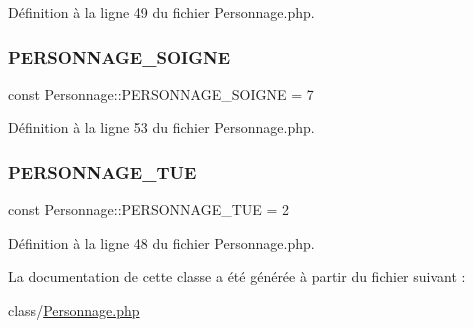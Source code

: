 Définition à la ligne 49 du fichier Personnage.\+php.

\mbox{\label{class_personnage_a8af7b48a38eda95264d46bd5b742a360}} 
\subsubsection{\texorpdfstring{P\+E\+R\+S\+O\+N\+N\+A\+G\+E\+\_\+\+S\+O\+I\+G\+NE}{PERSONNAGE\_SOIGNE}}
{\footnotesize\ttfamily const Personnage\+::\+P\+E\+R\+S\+O\+N\+N\+A\+G\+E\+\_\+\+S\+O\+I\+G\+NE = 7}



Définition à la ligne 53 du fichier Personnage.\+php.

\mbox{\label{class_personnage_ae654e11146b60710874ae7ddd8e0f9af}} 
\subsubsection{\texorpdfstring{P\+E\+R\+S\+O\+N\+N\+A\+G\+E\+\_\+\+T\+UE}{PERSONNAGE\_TUE}}
{\footnotesize\ttfamily const Personnage\+::\+P\+E\+R\+S\+O\+N\+N\+A\+G\+E\+\_\+\+T\+UE = 2}



Définition à la ligne 48 du fichier Personnage.\+php.



La documentation de cette classe a été générée à partir du fichier suivant \+:\begin{DoxyCompactItemize}
\item 
class/\mbox{\hyperlink{_personnage_8php}{Personnage.\+php}}\end{DoxyCompactItemize}
